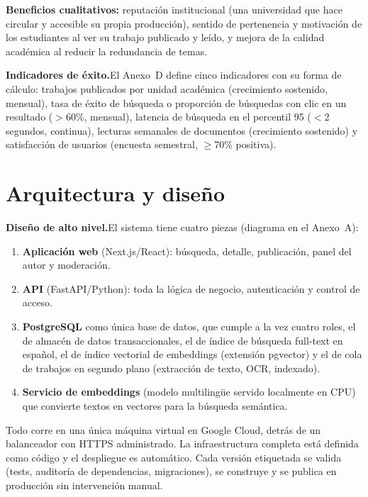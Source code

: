 \documentclass[12pt,a4paper]{article}
\begin{document}
\medskip
\noindent\textbf{Beneficios cualitativos:} reputación institucional (una universidad que hace circular y accesible su propia producción), sentido de pertenencia y motivación de los estudiantes al ver su trabajo publicado y leído, y mejora de la calidad académica al reducir la redundancia de temas.

\medskip
\noindent\textbf{Indicadores de éxito.}\enspace El Anexo~D define cinco indicadores con su forma de cálculo: trabajos publicados por unidad académica (crecimiento sostenido, mensual), tasa de éxito de búsqueda o proporción de búsquedas con clic en un resultado ($>$60\%, mensual), latencia de búsqueda en el percentil 95 ($<$2 segundos, continua), lecturas semanales de documentos (crecimiento sostenido) y satisfacción de usuarios (encuesta semestral, $\geq$70\% positiva).

\section{Arquitectura y diseño}

\noindent\textbf{Diseño de alto nivel.}\enspace El sistema tiene cuatro piezas (diagrama en el Anexo~A):

\begin{enumerate}
  \item \textbf{Aplicación web} (Next.js/React): búsqueda, detalle, publicación, panel del autor y moderación.
  \item \textbf{API} (FastAPI/Python): toda la lógica de negocio, autenticación y control de acceso.
  \item \textbf{PostgreSQL} como única base de datos, que cumple a la vez cuatro roles, el de almacén de datos transaccionales, el de índice de búsqueda full-text en español, el de índice vectorial de embeddings (extensión pgvector) y el de cola de trabajos en segundo plano (extracción de texto, OCR, indexado).
  \item \textbf{Servicio de embeddings} (modelo multilingüe servido localmente en CPU) que convierte textos en vectores para la búsqueda semántica.
\end{enumerate}

Todo corre en una única máquina virtual en Google Cloud, detrás de un balanceador con HTTPS administrado. La infraestructura completa está definida como código y el despliegue es automático. Cada versión etiquetada se valida (tests, auditoría de dependencias, migraciones), se construye y se publica en producción sin intervención manual.
\end{document}
